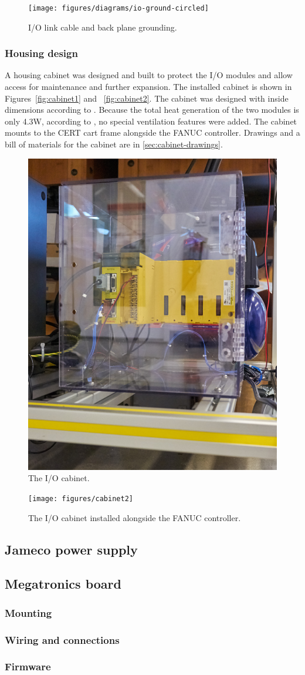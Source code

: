 \begin{figure}
    \centering
    \texttt{[image: figures/diagrams/io-ground-circled]}
    \caption{I/O link cable and back plane grounding.}
    \label{fig:io-ground}
\end{figure}

\subsubsection{Housing design}
A housing cabinet was designed and built to protect the I/O modules and allow access for maintenance and further expansion. The installed cabinet is shown in Figures~\ref{fig:cabinet1} and ~\ref{fig:cabinet2}. The cabinet was designed with inside dimensions according to \cite[sec~3.2]{io-unit}. Because the total heat generation of the two modules is only 4.3W, according to \cite[Table~3.3]{io-unit}, no special ventilation features were added. The cabinet mounts to the CERT cart frame alongside the FANUC controller. Drawings and a bill of materials for the cabinet are in \ref{sec:cabinet-drawings}.

\begin{figure}
    \centering
    \includegraphics[width=.5\linewidth]{figures/cabinet1}
    \caption{The I/O cabinet.}
    \label{fig:cabinet-1}
    \end{figure}

\begin{figure}
    \centering
    \texttt{[image: figures/cabinet2]}
    \caption{The I/O cabinet installed alongside the FANUC controller.}
    \label{fig:cabinet-2}
\end{figure}

\subsection{Jameco power supply}
\subsection{Megatronics board}
\subsubsection{Mounting}
\subsubsection{Wiring and connections}
\subsubsection{Firmware}
